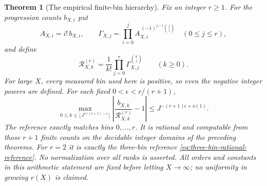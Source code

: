 \documentclass[11pt]{article}
\newtheorem{theorem}{Theorem}[section]
\theoremstyle{definition}
\begin{document}
\begin{theorem}[The empirical finite-bin hierarchy]
\label{thm:empirical-finite-bin-hierarchy}
Fix an integer $r\ge1$.
For the progression counts $b_{X,i}$ put
\begin{equation}
 A_{X,i}=i!\,b_{X,i},\qquad
 \Gamma_{X,j}=\prod_{i=0}^j
       A_{X,i}^{\,(-1)^{j-i}\binom ji}
                              \quad(0\le j\le r),
 \label{eq:finite-bin-empirical-parameters}
\end{equation}
and define
\begin{equation}
 \mathcal R^{(r)}_{X,k}
       =\frac1{k!}\prod_{j=0}^r
                       \Gamma_{X,j}^{\binom kj}\qquad(k\ge0).
 \label{eq:finite-bin-rational-reference}
\end{equation}
For large $X$, every measured bin used here is positive,
so even the negative integer powers are defined.
For each fixed $0<\epsilon<r/(r+1)$,
\begin{equation}
 \max_{0\le k\le\lfloor J^{\,r/(r+1)-\epsilon}\rfloor}
    \left|\frac{b_{X,k}}{\mathcal R^{(r)}_{X,k}}-1\right|
       \le J^{-(r+1)\epsilon+o(1)}.
 \label{eq:finite-bin-hierarchy-relative}
\end{equation}
The reference exactly matches bins $0,\ldots,r$.
It is rational and computable from those $r+1$ finite counts
on the decidable integer domains of the preceding theorems.
For $r=2$ it is exactly the three-bin reference
\eqref{eq:three-bin-rational-reference}.
No normalization over all ranks is asserted.
All orders and constants in this arithmetic statement are fixed
before letting $X\to\infty$; no uniformity in growing $r(X)$
is claimed.
\end{theorem}
\end{document}
